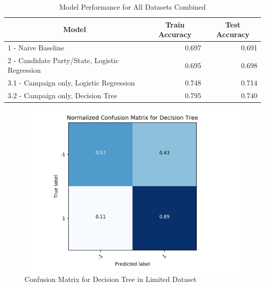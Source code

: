 \documentclass[a0]{a0poster}
\begin{document}
\begin{textblock}{7.0}
\begin{table}[htb]
\begin{tabular}{|l|r|r|}
\hline
\multicolumn{1}{|c|}{Model} & \multicolumn{1}{c|}{Train Accuracy} & \multicolumn{1}{c|}{Test Accuracy} \\ \hline
1 - Naive Baseline  & 0.697      & 0.691         \\ \hline
2 - Candidate Party/State, Logistic Regression  & 0.695      & 0.698         \\ \hline
3.1 - Campaign only, Logistic Regression & 0.748      & 0.714         \\ \hline
3.2 - Campaign only, Decision Tree & 0.795      & 0.740         \\ \hline
\end{tabular}
\caption{Model Performance for All Datasets Combined}
  \label{tab:model2}
\end{table}

\begin{figure}
\centering
\begin{minipage}{0.48\linewidth}

\includegraphics[width=\linewidth]{confusion_tree_limited}
\caption{Confusion Matrix for Decision Tree in Limited Dataset}
\label{fig:confusion_tree_limited}
\end{minipage}\hfill
\begin{minipage}{0.48\linewidth}


\end{minipage}
\end{figure}
\end{textblock}
\end{document}
